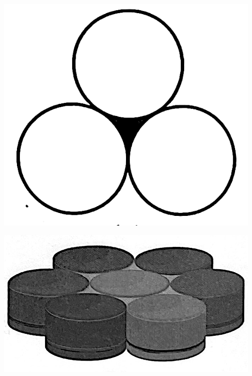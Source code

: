\documentclass{report}
\begin{document}
\begin{enumerate}
\begin{multicols}{2}
\begin{enumerate}
	      	      \begin{center}
	      	      	\includegraphics[scale=0.14]{assets/8-29.png}
	      	      \end{center}
	      	      \begin{center}
	      	      	\includegraphics[scale=0.14]{assets/8-30.png}
	      	      \end{center}
	      \end{enumerate}
	\end{multicols}
\end{enumerate}

\newpage

\end{document}
